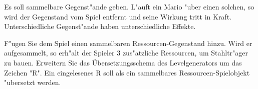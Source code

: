 Es soll sammelbare Gegenst"ande geben. L"auft ein Mario "uber einen solchen, so wird der Gegenstand vom Spiel entfernt und seine Wirkung tritt in Kraft. Unterschiedliche Gegenst"ande haben unterschiedliche Effekte.

F"ugen Sie dem Spiel einen sammelbaren Ressourcen-Gegenstand hinzu. Wird er aufgesammelt, so erh"alt der Spieler 3 zus"atzliche Ressourcen, um Stahltr"ager zu bauen.
Erweitern Sie das Übersetzungsschema des Levelgenerators um das Zeichen "R". Ein eingelesenes R soll als ein sammelbares Ressourcen-Spielobjekt "ubersetzt werden.